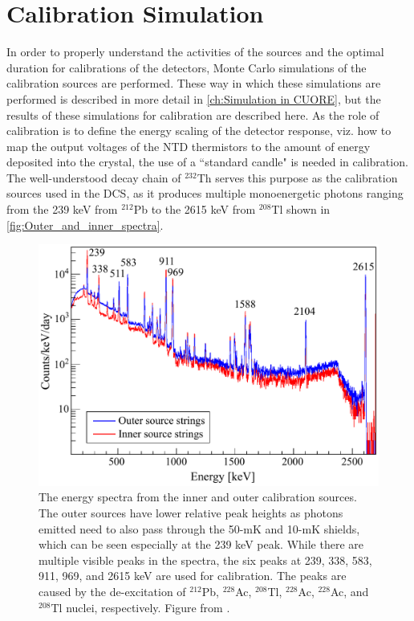 \section{Calibration Simulation}
In order to properly understand the activities of the sources and the optimal duration for calibrations of the detectors, Monte Carlo simulations of the calibration sources are performed.
These way in which these simulations are performed is described in more detail in \autoref{ch:Simulation in CUORE}, but the results of these simulations for calibration are described here.
As the role of calibration is to define the energy scaling of the detector response, viz. how to map the output voltages of the NTD thermistors to the amount of energy deposited into the crystal, the use of a ``standard candle" is needed in calibration.
The well-understood decay chain of $^{232}$Th serves this purpose as the calibration sources used in the DCS, as it produces multiple monoenergetic photons ranging from the 239 keV from $^{212}$Pb to the 2615 keV from $^{208}$Tl shown in \autoref{fig:Outer_and_inner_spectra}.
\begin{figure}[htbp]
    \centering
    \includegraphics[width=0.9\linewidth]{Figures/overlapping_spectra.pdf}
    \caption[The energy spectra from the inner and outer calibration sources.]
    {The energy spectra from the inner and outer calibration sources.
    The outer sources have lower relative peak heights as photons emitted need to also pass through the 50-mK and 10-mK shields, which can be seen especially at the 239 keV peak. 
    While there are multiple visible peaks in the spectra, the six peaks at 239, 338, 583, 911, 969, and 2615 keV are used for calibration.
    The peaks are caused by the de-excitation of $^{212}$Pb, $^{228}$Ac, $^{208}$Tl, $^{228}$Ac, $^{228}$Ac, and $^{208}$Tl nuclei, respectively.
    Figure from \cite{Cushman:2016cnv}.}
    \label{fig:Outer_and_inner_spectra}
\end{figure}

